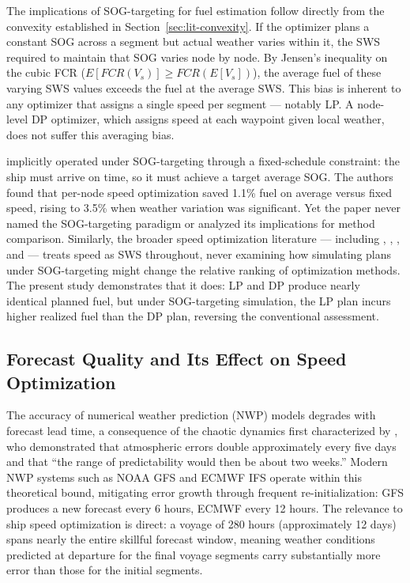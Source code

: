 \documentclass[review,authoryear]{elsarticle}  %
\begin{document}
The implications of SOG-targeting for fuel estimation follow directly from the convexity established in Section~\ref{sec:lit-convexity}. If the optimizer plans a constant SOG across a segment but actual weather varies within it, the SWS required to maintain that SOG varies node by node. By Jensen's inequality on the cubic FCR ($E[FCR(V_s)] \geq FCR(E[V_s])$), the average fuel of these varying SWS values exceeds the fuel at the average SWS. This bias is inherent to any optimizer that assigns a single speed per segment --- notably LP. A node-level DP optimizer, which assigns speed at each waypoint given local weather, does not suffer this averaging bias.

\citet{Huotari2021} implicitly operated under SOG-targeting through a fixed-schedule constraint: the ship must arrive on time, so it must achieve a target average SOG. The authors found that per-node speed optimization saved 1.1\% fuel on average versus fixed speed, rising to 3.5\% when weather variation was significant. Yet the paper never named the SOG-targeting paradigm or analyzed its implications for method comparison. Similarly, the broader speed optimization literature --- including \citet{Psaraftis2013}, \citet{Norstad2011}, \citet{Bektas2011}, and \citet{Ronen2011} --- treats speed as SWS throughout, never examining how simulating plans under SOG-targeting might change the relative ranking of optimization methods. The present study demonstrates that it does: LP and DP produce nearly identical planned fuel, but under SOG-targeting simulation, the LP plan incurs higher realized fuel than the DP plan, reversing the conventional assessment.

\subsection{Forecast Quality and Its Effect on Speed Optimization}
\label{sec:lit-forecast}

The accuracy of numerical weather prediction (NWP) models degrades with forecast lead time, a consequence of the chaotic dynamics first characterized by \citet{Lorenz1969}, who demonstrated that atmospheric errors double approximately every five days and that ``the range of predictability would then be about two weeks.'' Modern NWP systems such as NOAA GFS and ECMWF IFS operate within this theoretical bound, mitigating error growth through frequent re-initialization: GFS produces a new forecast every 6 hours, ECMWF every 12 hours. The relevance to ship speed optimization is direct: a voyage of 280 hours (approximately 12 days) spans nearly the entire skillful forecast window, meaning weather conditions predicted at departure for the final voyage segments carry substantially more error than those for the initial segments.
\end{document}

